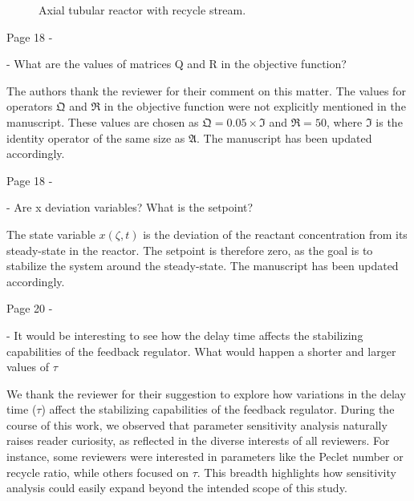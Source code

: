 \documentclass[11pt,answers]{exam}
\begin{document}
\begin{questions}
\begin{figure}[H]
\begin{tikzpicture}
        \end{tikzpicture}
        \caption{Axial tubular reactor with recycle stream.}
        \label{fig:reactor}
    \end{figure}

    \question Page 18 - 

    - What are the values of matrices Q and R in the objective function?

    \begin{solutionorbox} \label{comment:1_12}
        The authors thank the reviewer for their comment on this matter. The values for operators $\mathfrak{Q}$ and $\mathfrak{R}$ in the objective function were not explicitly mentioned in the manuscript. These values are chosen as $\mathfrak{Q} = 0.05 \times \mathfrak{I}$ and $\mathfrak{R} = 50$, where $\mathfrak{I}$ is the identity operator of the same size as $\mathfrak{A}$. The manuscript has been updated accordingly.
    \end{solutionorbox}


    \question Page 18 - 

    - Are x deviation variables? What is the setpoint?

    \begin{solutionorbox} \label{comment:1_13}
        The state variable $x(\zeta,t)$ is the deviation of the reactant concentration from its steady-state in the reactor. The setpoint is therefore zero, as the goal is to stabilize the system around the steady-state. The manuscript has been updated accordingly.
    \end{solutionorbox}


    \question Page 20 - 

    - It would be interesting to see how the delay time affects the stabilizing capabilities of the feedback regulator. What would happen a shorter and larger values of $\tau$

    \begin{solutionorbox} \label{comment:1_14}
        We thank the reviewer for their suggestion to explore how variations in the delay time (\(\tau\)) affect the stabilizing capabilities of the feedback regulator. During the course of this work, we observed that parameter sensitivity analysis naturally raises reader curiosity, as reflected in the diverse interests of all reviewers. For instance, some reviewers were interested in parameters like the Peclet number or recycle ratio, while others focused on \(\tau\). This breadth highlights how sensitivity analysis could easily expand beyond the intended scope of this study.


\end{solutionorbox}
\end{questions}
\end{document}
